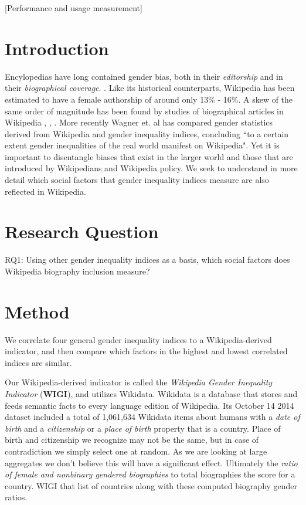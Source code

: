 \documentclass{sig-alternate}
\begin{document}
[Performance and usage measurement]



\section{Introduction}
Encylopedias have long contained gender bias, both in their \textit{editorship} and in their \textit{biographical coverage}. \cite{thomas:respect} \cite{reagle}. Like its historical counterparts, Wikipedia has been estimated to have a female authorship of around only 13\% - 16\%\cite{hill}. A skew of the same order of magnitude has been found by studies of biographical articles in Wikipedia \cite{lam}, \cite{eom}, \cite{reagle}.  More recently Wagner et. al has compared gender statistics derived from Wikipedia and gender inequality indices, concluding ``to a certain extent gender inequalities of the real world manifest on Wikipedia"\cite{DBLP:journals/corr/WagnerGJS15}.  Yet it is important to disentangle biases that exist in the larger world and those that are introduced by Wikipedians and Wikipedia policy. We seek to understand in more detail which social factors that gender inequality indices measure are also reflected in Wikipedia.


\section{Research Question}
RQ1: Using other gender inequality indices as a basis, which social factors does Wikipedia biography inclusion measure?


\section{Method}
We correlate four general gender inequality indices to a Wikipedia-derived indicator, and then compare which factors in the highest and lowest correlated indices are similar.

Our Wikipedia-derived indicator is called the \textit{Wikipedia Gender Inequality Indicator} (\textbf{WIGI}), and utilizes Wikidata. Wikidata is a database that stores and feeds semantic facts to every language edition of Wikipedia. Its October 14 2014 dataset included a total of 1,061,634 Wikidata items about humans with a \textit{date of birth} and a \textit{citizenship} or a \textit{place of birth} property that is a country. Place of birth and citizenship we recognize may not be the same, but in case of contradiction we simply select one at random. As we are looking at large aggregates we don't believe this will have a significant effect. Ultimately the \textit{ratio of female and nonbinary gendered biographies} to total biographies the score for a country\cite{klein:wigi}. WIGI that list of countries along with these computed biography gender ratios.
\end{document}
